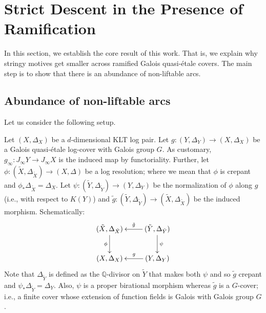 \documentclass[12pt]{amsart}
\theoremstyle{plain}   %
\theoremstyle{definition}    %
\theoremstyle{remark}    %
\numberwithin{equation}{theorem}
\newcommand{\bQ}{\mathbb{Q}}
\begin{document}
\section{Strict Descent in the Presence of Ramification} \label{sec.StrictDecentRamification}
In this section, we establish the core result of this work. That is, we explain why stringy motives get smaller across ramified Galois quasi-\'etale covers. The main step is to show that there is an abundance of non-liftable arcs. \subsection{Abundance of non-liftable arcs} Let us consider the following setup.
\begin{setup} \label{set:MainSetup}
Let $(X,\Delta_X)$ be a $d$-dimensional KLT log pair. Let $g \colon (Y,\Delta_Y) \to (X,\Delta_X)$ be a Galois quasi-\'etale log-cover with Galois group $G$. As customary, $g_{\infty}  \colon J_{\infty} Y \to J_{\infty} X$ is the induced map by functoriality. Further, let $\phi \colon (\tilde{X}, \Delta_{\tilde{X}}) \to (X,\Delta)$ be a log resolution; where we mean that $\phi$ is crepant and $\phi_* \Delta_{\tilde{X}} = \Delta_X$. Let $\psi \colon (\tilde{Y},\Delta_{\tilde{Y}}) \to (Y,\Delta_Y)$ be the normalization of $\phi$ along $g$ (i.e., with respect to $K(Y)$) and $\tilde{g} \colon (\tilde{Y}, \Delta_{\tilde{Y}}) \to (\tilde{X},\Delta_{\tilde{X}})$ be the induced morphism. Schematically:
\begin{equation} \label{eqn.CommSquareSetup}
\xymatrix{
(\tilde{X},\Delta_{\tilde{X}}) \ar[d]_-{\phi} & (\tilde{Y},\Delta_{\tilde{Y}}) \ar[d]^-{\psi} \ar[l]_-{\tilde{g}} \\
(X,\Delta_X) & (Y,\Delta_Y) \ar[l]_-{g}
}
\end{equation}
Note that $\Delta_{\tilde{Y}}$ is defined as the $\bQ$-divisor on $\tilde Y$ that makes both $\psi$ and so $\tilde{g}$ crepant and $\psi_* \Delta_{\tilde{Y}} = \Delta_Y$. Also, $\psi$ is a proper birational morphism whereas $\tilde{g}$ is a $G$-cover; i.e., a finite cover whose extension of function fields is Galois with Galois group $G$.
\end{setup}
\end{document}
